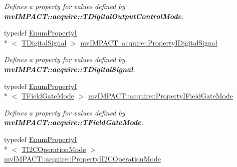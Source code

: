 \begin{DoxyCompactItemize}
\begin{DoxyCompactList}\small\item\em Defines a property for values defined by {\bfseries mv\+I\+M\+P\+A\+C\+T\+::acquire\+::\+T\+Digital\+Output\+Control\+Mode}. \end{DoxyCompactList}\item 
\hypertarget{group___device_specific_interface_gacc6f7760bd2f88895f8d5d63ce364132}{typedef \hyperlink{classmv_i_m_p_a_c_t_1_1acquire_1_1_enum_property_i}{Enum\+Property\+I}\\*
$<$ \hyperlink{group___device_specific_interface_ga29840a466892bced617a5f3a6edb5218}{T\+Digital\+Signal} $>$ \hyperlink{group___device_specific_interface_gacc6f7760bd2f88895f8d5d63ce364132}{mv\+I\+M\+P\+A\+C\+T\+::acquire\+::\+Property\+I\+Digital\+Signal}}\label{group___device_specific_interface_gacc6f7760bd2f88895f8d5d63ce364132}

\begin{DoxyCompactList}\small\item\em Defines a property for values defined by {\bfseries mv\+I\+M\+P\+A\+C\+T\+::acquire\+::\+T\+Digital\+Signal}. \end{DoxyCompactList}\item 
\hypertarget{group___device_specific_interface_ga625ac6e1557893c15272ebbbeab39958}{typedef \hyperlink{classmv_i_m_p_a_c_t_1_1acquire_1_1_enum_property_i}{Enum\+Property\+I}\\*
$<$ \hyperlink{group___device_specific_interface_gaa9f27b2d9c8c322f6d2f5eae6dbb18d1}{T\+Field\+Gate\+Mode} $>$ \hyperlink{group___device_specific_interface_ga625ac6e1557893c15272ebbbeab39958}{mv\+I\+M\+P\+A\+C\+T\+::acquire\+::\+Property\+I\+Field\+Gate\+Mode}}\label{group___device_specific_interface_ga625ac6e1557893c15272ebbbeab39958}

\begin{DoxyCompactList}\small\item\em Defines a property for values defined by {\bfseries mv\+I\+M\+P\+A\+C\+T\+::acquire\+::\+T\+Field\+Gate\+Mode}. \end{DoxyCompactList}\item 
\hypertarget{group___device_specific_interface_ga605f7a21a4a20a008acbd59d6f18f3e9}{typedef \hyperlink{classmv_i_m_p_a_c_t_1_1acquire_1_1_enum_property_i}{Enum\+Property\+I}\\*
$<$ \hyperlink{group___device_specific_interface_ga71e1af152f11720b7603b40de13855dc}{T\+I2\+C\+Operation\+Mode} $>$ \hyperlink{group___device_specific_interface_ga605f7a21a4a20a008acbd59d6f18f3e9}{mv\+I\+M\+P\+A\+C\+T\+::acquire\+::\+Property\+I\+I2\+C\+Operation\+Mode}}\label{group___device_specific_interface_ga605f7a21a4a20a008acbd59d6f18f3e9}


\end{DoxyCompactItemize}
